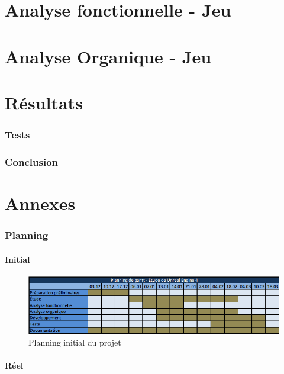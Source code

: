 \documentclass[11pt, a4paper, oneside]{article}
\begin{document}
\part{Analyse fonctionnelle - Jeu}
\newpage
\part{Analyse Organique - Jeu}
\newpage
\part{Résultats}
\section{Tests}
\section{Conclusion}
\newpage
\part{Annexes}
\section{Planning}
\subsection{Initial}
\begin{figure}[h]
	\begin{center}
	\includegraphics[scale=.924, angle=90]{planninggantt}
	\caption{Planning initial du projet}
	\label{planningintial}
	\end{center}
\end{figure}
\newpage
\subsection{Réel}
\end{document}

